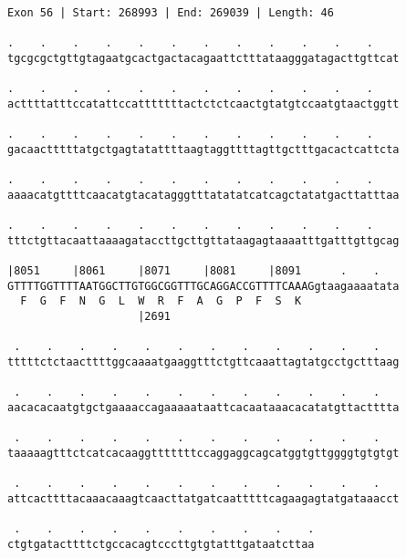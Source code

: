 \documentclass{article}
\begin{document}
\newpage
\begin{Verbatim}
Exon 56 | Start: 268993 | End: 269039 | Length: 46
 
.    .    .    .    .    .    .    .    .    .    .    .    
tgcgcgctgttgtagaatgcactgactacagaattctttataagggatagacttgttcat
  
.    .    .    .    .    .    .    .    .    .    .    .    
acttttatttccatattccatttttttactctctcaactgtatgtccaatgtaactggtt
  
.    .    .    .    .    .    .    .    .    .    .    .    
gacaactttttatgctgagtatattttaagtaggttttagttgctttgacactcattcta
  
.    .    .    .    .    .    .    .    .    .    .    .    
aaaacatgttttcaacatgtacatagggtttatatatcatcagctatatgacttatttaa
  
.    .    .    .    .    .    .    .    .    .    .    .    
tttctgttacaattaaaagataccttgcttgttataagagtaaaatttgatttgttgcag
  
|8051     |8061     |8071     |8081     |8091      .    .   
GTTTTGGTTTTAATGGCTTGTGGCGGTTTGCAGGACCGTTTTCAAAGgtaagaaaatata
  F  G  F  N  G  L  W  R  F  A  G  P  F  S  K               
                    |2691                                   
  
 .    .    .    .    .    .    .    .    .    .    .    .   
tttttctctaacttttggcaaaatgaaggtttctgttcaaattagtatgcctgctttaag
  
 .    .    .    .    .    .    .    .    .    .    .    .   
aacacacaatgtgctgaaaaccagaaaaataattcacaataaacacatatgttactttta
  
 .    .    .    .    .    .    .    .    .    .    .    .   
taaaaagtttctcatcacaaggtttttttccaggaggcagcatggtgttggggtgtgtgt
  
 .    .    .    .    .    .    .    .    .    .    .    .   
attcacttttacaaacaaagtcaacttatgatcaatttttcagaagagtatgataaacct
  
 .    .    .    .    .    .    .    .    .    .
ctgtgatacttttctgccacagtcccttgtgtatttgataatcttaa
\end{Verbatim}
\newpage
\end{document}
